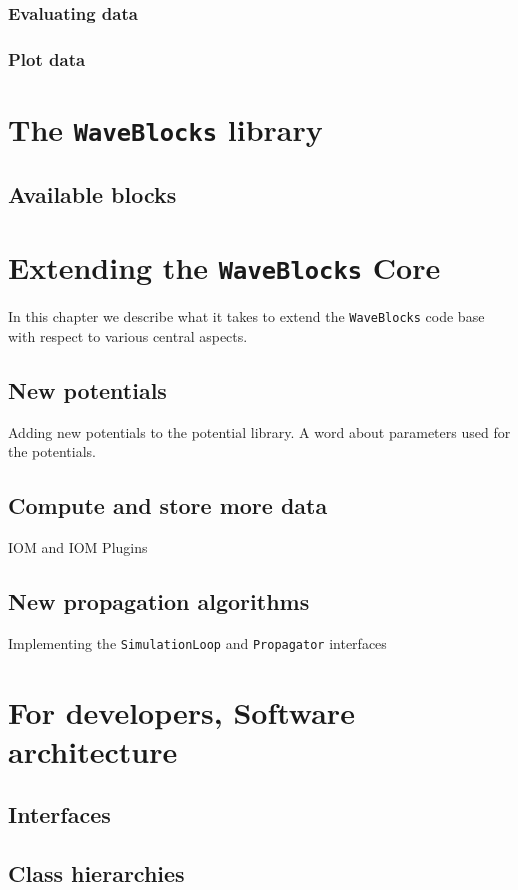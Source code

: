 \documentclass[a4paper,10pt]{report}
\begin{document}
\subsection{Evaluating data}

\subsection{Plot data}






\chapter{The \texttt{WaveBlocks} library}

\section{Available blocks}



\chapter{Extending the \texttt{WaveBlocks} Core}

In this chapter we describe what it takes to extend the \texttt{WaveBlocks}
code base with respect to various central aspects.

\section{New potentials}

Adding new potentials to the potential library.
A word about parameters used for the potentials.

\section{Compute and store more data}

IOM and IOM Plugins

\section{New propagation algorithms}

Implementing the \texttt{SimulationLoop} and \texttt{Propagator} interfaces









\chapter{For developers, Software architecture}

\section{Interfaces}

\section{Class hierarchies}
\end{document}
